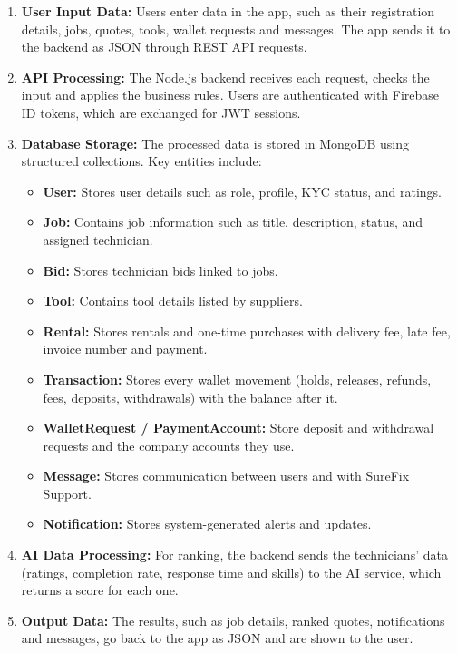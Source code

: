 \documentclass[A4paper,12pt]{report}
\theoremstyle{plain}
\theoremstyle{definition}
\theoremstyle{remark}
\numberwithin{equation}{section}
\begin{document}
\begin{enumerate}
    \item \textbf{User Input Data:}  
    Users enter data in the app, such as their registration details, jobs, quotes, tools, wallet requests and messages. The app sends it to the backend as JSON through REST API requests.

    \item \textbf{API Processing:}  
        The Node.js backend receives each request, checks the input and applies the business rules. Users are authenticated with Firebase ID tokens, which are exchanged for JWT sessions.

    \item \textbf{Database Storage:}  
    The processed data is stored in MongoDB using structured collections. Key entities include:
    \begin{itemize}
        \item \textbf{User:} Stores user details such as role, profile, KYC status, and ratings.
        \item \textbf{Job:} Contains job information such as title, description, status, and assigned technician.
        \item \textbf{Bid:} Stores technician bids linked to jobs.
        \item \textbf{Tool:} Contains tool details listed by suppliers.
                \item \textbf{Rental:} Stores rentals and one-time purchases with delivery fee, late fee, invoice number and payment.
        \item \textbf{Transaction:} Stores every wallet movement (holds, releases, refunds, fees, deposits, withdrawals) with the balance after it.
        \item \textbf{WalletRequest / PaymentAccount:} Store deposit and withdrawal requests and the company accounts they use.
        \item \textbf{Message:} Stores communication between users and with SureFix Support.
        \item \textbf{Notification:} Stores system-generated alerts and updates.
    \end{itemize}

    \item \textbf{AI Data Processing:}  
    For ranking, the backend sends the technicians' data (ratings, completion rate, response time and skills) to the AI service, which returns a score for each one.

    \item \textbf{Output Data:}  
    The results, such as job details, ranked quotes, notifications and messages, go back to the app as JSON and are shown to the user.
\end{enumerate}
\end{document}
